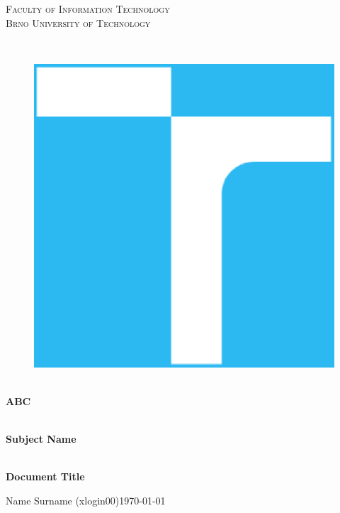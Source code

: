 \documentclass[11pt,a4paper]{article}
\begin{document}
\begin{titlepage}

    \begin{center}
        \vfill {%
            \Huge{%
                \textsc{%
                    Faculty of Information Technology\\[3mm]%
                    Brno University of Technology%
                }%
            }%
        }%

        \hfill\\[15mm]

        \begin{figure}[!h]
            \centering
            \includegraphics[scale=0.3]{vutbr-fit-logo.eps}
        \end{figure}

        \hfill\\[10mm]

        \Huge{
            \textbf{
                ABC
            }
        }

        \hfill\\[-10mm]

        \huge{
            \textbf{
                Subject Name
            }
        }

        \hfill\\[10mm]

        \LARGE{
            \textbf{
                Document Title
            }
        }
        \vfill

    \end{center}

        \Large{
            \noindent Name Surname (xlogin00)\hfill \today
        }

\end{titlepage}
\end{document}
